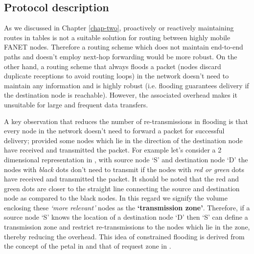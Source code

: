 \subsection{Protocol description} 
\label{protocol_description}

As we discussed in Chapter \ref{chap-two}, proactively or reactively maintaining routes in tables is not a suitable solution for routing between highly mobile FANET nodes. Therefore a routing scheme which does not maintain end-to-end paths and doesn't employ next-hop forwarding would be more robust. On the other hand, a routing scheme that always floods a packet (nodes discard duplicate receptions to avoid routing loops) in the network doesn't need to maintain any information and is highly robust (i.e. flooding guarantees delivery if the destination node is reachable). However, the associated overhead makes it unsuitable for large and frequent data transfers. 

 A key observation that reduces the number of re-transmissions in flooding is that every node in the network doesn't need to forward a packet for successful delivery; provided some nodes which lie in the direction of the destination node have received and transmitted the packet. For example let's consider a 2 dimensional representation in , with source node `S' and destination node `D' the nodes with \emph{black} dots don't need to transmit if the nodes with \emph{red or green} dots have received and transmitted the packet. It should be noted that the red and green dots are closer to the straight line connecting the source and destination node as compared to the black nodes. In this regard we signify the volume enclosing these \emph{`more relevant'} nodes as the \textbf{`transmission zone'}. Therefore, if a source node `S' knows the location of a destination node `D' then `S' can define a transmission zone and restrict re-transmissions to the nodes which lie in the zone, thereby reducing the overhead. This idea of constrained flooding is derived from the concept of the petal in \cite{6133499} and that of request zone in \cite{Ko:1998:LRM:288235.288252}. 

